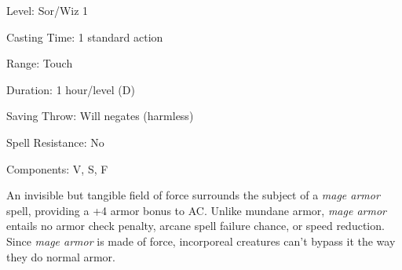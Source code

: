 
\begin{description*}
\item[Level:] Sor/Wiz 1
\item[Casting Time:] 1 standard action
\item[Range:] Touch
\item[Duration:] 1 hour/level (D)
\item[Saving Throw:] Will negates (harmless)
\item[Spell Resistance:] No
\item[Components:] V, S, F
\end{description*}

An invisible but tangible field of force surrounds the subject of a \textit{mage
armor} spell, providing a +4 armor bonus to AC.
Unlike mundane armor, \textit{mage armor} entails no armor check penalty, arcane
spell failure chance, or speed reduction. Since \textit{mage armor} is made of
force, incorporeal creatures can't bypass it the way they do normal armor.